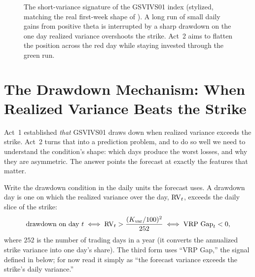 \begin{figure}[ht]
\centering
{}
\caption{The short-variance signature of the GSVIVS01 index (stylized, matching the real first-week shape of ). A long run of small daily gains from positive theta is interrupted by a sharp drawdown on the one day realized variance overshoots the strike. Act~2 aims to flatten the position across the red day while staying invested through the green run.}
\label{fig:gsvivs:indexpath}
\end{figure}

\section{The Drawdown Mechanism: When Realized Variance Beats the Strike}
\label{sec:gsvivs:drawdown-mechanism}

Act~1 established \emph{that} GSVIVS01 draws down when realized variance exceeds the strike. Act~2 turns that into a prediction problem, and to do so well we need to understand the condition's shape: which days produce the worst losses, and why they are asymmetric. The answer points the forecast at exactly the features that matter.

Write the drawdown condition in the daily units the forecast uses. A drawdown day is one on which the realized variance over the day, $\operatorname{RV}_t$, exceeds the daily slice of the strike:
\begin{equation}
\label{eq:gsvivs:drawdown}
\text{drawdown on day } t \iff \operatorname{RV}_t > \frac{(K_{\mathrm{var}}/100)^2}{252} \iff \text{VRP Gap}_t < 0,
\end{equation}
where $252$ is the number of trading days in a year (it converts the annualized strike variance into one day's share). The third form uses ``VRP Gap,'' the signal defined in  below; for now read it simply as ``the forecast variance exceeds the strike's daily variance.''

